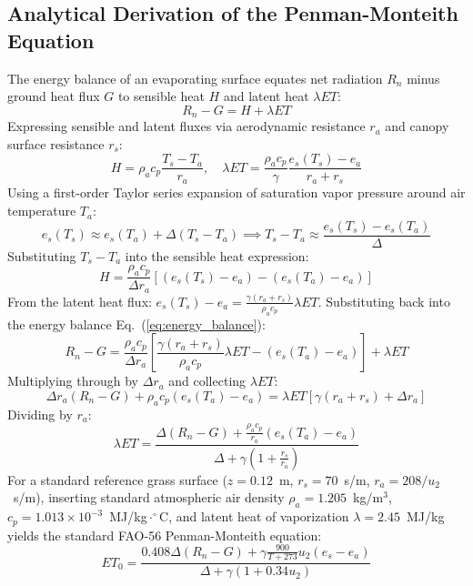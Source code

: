 \documentclass[11pt,a4paper]{article}
\theoremstyle{definition}
\theoremstyle{remark}
\begin{document}
\subsection{Analytical Derivation of the Penman-Monteith Equation}
The energy balance of an evaporating surface equates net radiation $R_n$ minus ground heat flux $G$ to sensible heat $H$ and latent heat $\lambda ET$:
\begin{equation}
    \label{eq:energy_balance}
    R_n - G = H + \lambda ET
\end{equation}
Expressing sensible and latent fluxes via aerodynamic resistance $r_a$ and canopy surface resistance $r_s$:
\begin{equation}
    H = \rho_a c_p \frac{T_s - T_a}{r_a}, \quad \lambda ET = \frac{\rho_a c_p}{\gamma} \frac{e_s(T_s) - e_a}{r_a + r_s}
\end{equation}
Using a first-order Taylor series expansion of saturation vapor pressure around air temperature $T_a$:
\begin{equation}
    e_s(T_s) \approx e_s(T_a) + \Delta (T_s - T_a) \implies T_s - T_a \approx \frac{e_s(T_s) - e_s(T_a)}{\Delta}
\end{equation}
Substituting $T_s - T_a$ into the sensible heat expression:
\begin{equation}
    H = \frac{\rho_a c_p}{\Delta r_a} \left[ (e_s(T_s) - e_a) - (e_s(T_a) - e_a) \right]
\end{equation}
From the latent heat flux: $e_s(T_s) - e_a = \frac{\gamma (r_a + r_s)}{\rho_a c_p} \lambda ET$. Substituting back into the energy balance Eq.~(\ref{eq:energy_balance}):
\begin{equation}
    R_n - G = \frac{\rho_a c_p}{\Delta r_a} \left[ \frac{\gamma (r_a + r_s)}{\rho_a c_p} \lambda ET - (e_s(T_a) - e_a) \right] + \lambda ET
\end{equation}
Multiplying through by $\Delta r_a$ and collecting $\lambda ET$:
\begin{equation}
    \Delta r_a (R_n - G) + \rho_a c_p (e_s(T_a) - e_a) = \lambda ET \left[ \gamma(r_a + r_s) + \Delta r_a \right]
\end{equation}
Dividing by $r_a$:
\begin{equation}
    \lambda ET = \frac{\Delta (R_n - G) + \frac{\rho_a c_p}{r_a} (e_s(T_a) - e_a)}{\Delta + \gamma \left( 1 + \frac{r_s}{r_a} \right)}
\end{equation}
For a standard reference grass surface ($z = 0.12$~m, $r_s = 70$~s/m, $r_a = 208/u_2$~s/m), inserting standard atmospheric air density $\rho_a = 1.205$~kg/m$^3$, $c_p = 1.013 \times 10^{-3}$~MJ/kg$\cdot^\circ$C, and latent heat of vaporization $\lambda = 2.45$~MJ/kg yields the standard FAO-56 Penman-Monteith equation:
\begin{equation}
    ET_0 = \frac{0.408 \Delta (R_n - G) + \gamma \frac{900}{T + 273} u_2 (e_s - e_a)}{\Delta + \gamma (1 + 0.34 u_2)}
\end{equation}
\end{document}
